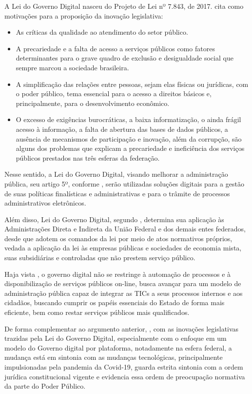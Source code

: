 A Lei do Governo Digital nasceu do Projeto de Lei nº 7.843, de 2017. \cite{pl_lgd} cita como motivações para a proposição da inovação legislativa:

\begin{itemize}
    \item As críticas da qualidade ao atendimento do setor público.
    \item A precariedade e a falta de acesso a serviços públicos como fatores determinantes para o grave quadro de exclusão e desigualdade social que sempre marcou a sociedade brasileira. 
    \item  A simplificação das relações entre pessoas,
    sejam elas físicas ou jurídicas, com o poder público, tema essencial para o acesso a direitos básicos e, principalmente, para o desenvolvimento econômico.
    \item O excesso de exigências burocráticas, a baixa informatização, o ainda frágil acesso à informação, a falta de abertura das bases de dados públicos, a ausência de mecanismos de participação e inovação, além da corrupção, são alguns dos problemas que explicam a precariedade e ineficiência dos serviços públicos prestados
    nas três esferas da federação.
\end{itemize}

Nesse sentido, a Lei do Governo Digital, visando melhorar a administração pública, seu artigo 5º, conforme \cite{l14129}, serão utilizadas soluções digitais para a gestão de suas políticas finalísticas e administrativas e para o trâmite de processos administrativos eletrônicos.

Além disso, Lei do Governo Digital, segundo \cite{l14129}, determina sua aplicação às Administrações Direta e Indireta da União Federal e dos demais entes federados, desde que adotem os comandos da lei por meio de atos normativos próprios, vedada a aplicação da lei às empresas públicas e sociedades de economia mista, suas subsidiárias e controladas que não prestem serviço público.

Haja vista \cite{reck2021transformaccao}, o governo digital não se restringe à automação de processos e à disponibilização de serviços públicos on-line, busca avançar para um modelo de administração pública capaz de integrar as TICs a seus processos internos e aos cidadãos, buscando cumprir os papéis essenciais do Estado de forma mais eficiente, bem como restar serviços públicos mais qualificados. 

De forma complementar ao argumento anterior, \cite{lima2023governo}, com as inovações legislativas trazidas pela Lei do Governo Digital, especialmente com o enfoque em um modelo do Governo digital por plataforma, notadamente na esfera federal, a mudança está em sintonia com as mudanças tecnológicas, principalmente impulsionadas pela pandemia da Covid-19, guarda estrita sintonia com a ordem jurídica constitucional vigente e evidencia essa ordem de preocupação normativa da parte do Poder Público.

